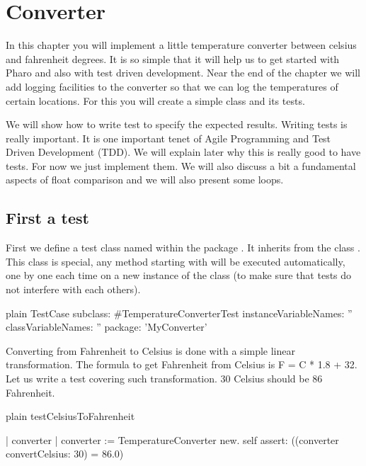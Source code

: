 \documentclass[10pt,twoside,english]{_support/latex/sbabook/sbabook}
\begin{document}
\frontmatter
\pagestyle{plain}

\tableofcontents*
\clearpage\listoffigures

\mainmatter

\chapter{Converter}\label{cha_converter}
In this chapter you will implement a little temperature converter between celsius and fahrenheit degrees. It is so simple that it will help us to get started with Pharo and also with test driven development. Near the end of the chapter we will add logging facilities to the converter so that we can log the temperatures of certain locations.  For this you will create a simple class and its tests. 

We will show how to write test to specify the expected results. Writing tests is really important. It is one important tenet of Agile Programming and Test Driven Development (TDD). We will explain later why this is really good to have tests. For now we just implement them. We will also discuss a bit a fundamental aspects of float comparison and we will also present some loops.
\section{First a test}
First we define a test class named  within the package . It inherits from the class . This class is special, any method starting with  will be executed automatically, one by one each time on a new instance of the class (to make sure that tests do not interfere with each others). 

\begin{displaycode}{plain}
TestCase subclass: #TemperatureConverterTest
	instanceVariableNames: ''
	classVariableNames: ''
	package: 'MyConverter'
\end{displaycode}

Converting from Fahrenheit to Celsius is done with a simple linear transformation.
The formula to get Fahrenheit from Celsius is F = C * 1.8 + 32. 
Let us write a test covering such transformation. 30 Celsius should be 86 Fahrenheit. 

\begin{displaycode}{plain}
testCelsiusToFahrenheit

	| converter |
	converter := TemperatureConverter new. 
	self assert: ((converter convertCelsius: 30) = 86.0)
\end{displaycode}
\end{document}
